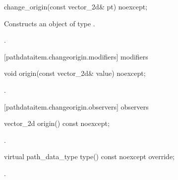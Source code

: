 \begin{itemdecl}
    change_origin(const vector_2d& pt) noexcept;
\end{itemdecl}
\begin{itemdescr}
	\pnum
	\effects
	Constructs an object of type .
	
	\pnum
	\postconditions
	.
\end{itemdescr}

 [pathdataitem.changeorigin.modifiers]{ modifiers}

\begin{itemdecl}
    void origin(const vector_2d& value) noexcept;
\end{itemdecl}
\begin{itemdescr}
	\pnum
	\postconditions
	.
	
\end{itemdescr}

 [pathdataitem.changeorigin.observers]{ observers}

\begin{itemdecl}
    vector_2d origin() const noexcept;
\end{itemdecl}
\begin{itemdescr}
	\pnum
	\returns
	.

\end{itemdescr}

\begin{itemdecl}
    virtual path_data_type type() const noexcept override;
\end{itemdecl}
\begin{itemdescr}
	\pnum
	\returns
	.

\end{itemdescr}
